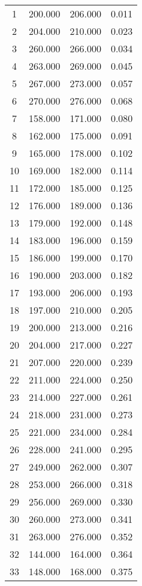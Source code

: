 % 
\begin{tabular}{cccc}
  \hline
  \hline
1 & 200.000 & 206.000 & 0.011 \\ 
  2 & 204.000 & 210.000 & 0.023 \\ 
  3 & 260.000 & 266.000 & 0.034 \\ 
  4 & 263.000 & 269.000 & 0.045 \\ 
  5 & 267.000 & 273.000 & 0.057 \\ 
  6 & 270.000 & 276.000 & 0.068 \\ 
  7 & 158.000 & 171.000 & 0.080 \\ 
  8 & 162.000 & 175.000 & 0.091 \\ 
  9 & 165.000 & 178.000 & 0.102 \\ 
  10 & 169.000 & 182.000 & 0.114 \\ 
  11 & 172.000 & 185.000 & 0.125 \\ 
  12 & 176.000 & 189.000 & 0.136 \\ 
  13 & 179.000 & 192.000 & 0.148 \\ 
  14 & 183.000 & 196.000 & 0.159 \\ 
  15 & 186.000 & 199.000 & 0.170 \\ 
  16 & 190.000 & 203.000 & 0.182 \\ 
  17 & 193.000 & 206.000 & 0.193 \\ 
  18 & 197.000 & 210.000 & 0.205 \\ 
  19 & 200.000 & 213.000 & 0.216 \\ 
  20 & 204.000 & 217.000 & 0.227 \\ 
  21 & 207.000 & 220.000 & 0.239 \\ 
  22 & 211.000 & 224.000 & 0.250 \\ 
  23 & 214.000 & 227.000 & 0.261 \\ 
  24 & 218.000 & 231.000 & 0.273 \\ 
  25 & 221.000 & 234.000 & 0.284 \\ 
  26 & 228.000 & 241.000 & 0.295 \\ 
  27 & 249.000 & 262.000 & 0.307 \\ 
  28 & 253.000 & 266.000 & 0.318 \\ 
  29 & 256.000 & 269.000 & 0.330 \\ 
  30 & 260.000 & 273.000 & 0.341 \\ 
  31 & 263.000 & 276.000 & 0.352 \\ 
  32 & 144.000 & 164.000 & 0.364 \\ 
  33 & 148.000 & 168.000 & 0.375 \\ 

\end{tabular}
